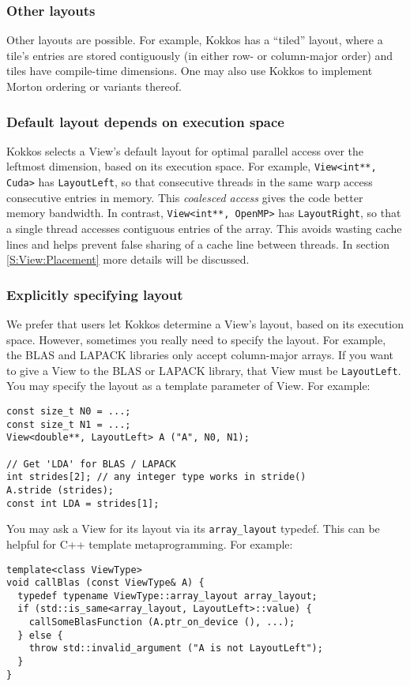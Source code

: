 \subsubsection{Other layouts}\label{SS:View::Layout::Other}

Other layouts are possible.  For example, Kokkos has a ``tiled''
layout, where a tile's entries are stored contiguously (in either row-
or column-major order) and tiles have compile-time dimensions.  One
may also use Kokkos to implement Morton ordering or variants thereof.

\subsubsection{Default layout depends on execution space}\label{SS:View:Layout:Default}

Kokkos selects a View's default layout for optimal parallel access
over the leftmost dimension, based on its execution space.  For
example, \lstinline!View<int**, Cuda>! has \lstinline!LayoutLeft!, so that
consecutive threads in the same warp access consecutive entries in
memory.  This \emph{coalesced access} gives the code better memory
bandwidth.  In contrast, \lstinline!View<int**, OpenMP>! has
\lstinline!LayoutRight!, so that a single thread accesses contiguous
entries of the array.  This avoids wasting cache lines and helps
prevent false sharing of a cache line between threads. 
In section \ref{S:View:Placement} more details will be discussed. 

\subsubsection{Explicitly specifying layout}\label{SS:View:Layout:Explicit}

We prefer that users let Kokkos determine a View's layout, based on
its execution space.  However, sometimes you really need to specify
the layout.  For example, the BLAS and LAPACK libraries only accept
column-major arrays.  If you want to give a View to the BLAS or
LAPACK library, that View must be \lstinline!LayoutLeft!.  You may specify the
layout as a template parameter of View.  For example:
\begin{lstlisting}
const size_t N0 = ...;
const size_t N1 = ...;
View<double**, LayoutLeft> A ("A", N0, N1);

// Get 'LDA' for BLAS / LAPACK
int strides[2]; // any integer type works in stride()
A.stride (strides);
const int LDA = strides[1];
\end{lstlisting}
You may ask a View for its layout via its \lstinline!array_layout! typedef.
This can be helpful for C++ template metaprogramming.  For example:
\begin{lstlisting}
template<class ViewType>
void callBlas (const ViewType& A) {
  typedef typename ViewType::array_layout array_layout;
  if (std::is_same<array_layout, LayoutLeft>::value) {
    callSomeBlasFunction (A.ptr_on_device (), ...);
  } else {
    throw std::invalid_argument ("A is not LayoutLeft");
  }
}
\end{lstlisting}

